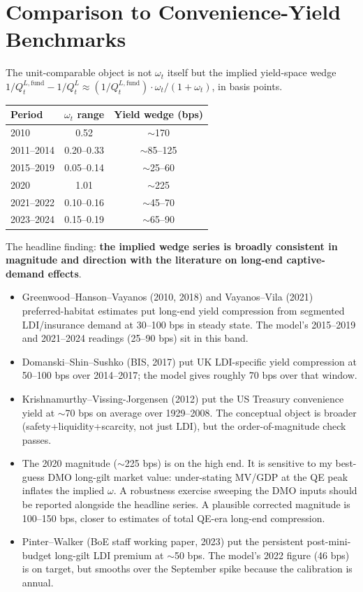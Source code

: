 \documentclass[11pt,a4paper]{article}
\begin{document}
\section{Comparison to Convenience-Yield Benchmarks}

The unit-comparable object is not $\omega_t$ itself but the implied yield-space wedge $1/Q^{L,\text{fund}}_t - 1/Q^L_t \approx (1/Q^{L,\text{fund}}_t) \cdot \omega_t/(1+\omega_t)$, in basis points.

\begin{center}
\begin{tabular}{l c c}
\toprule
Period & $\omega_t$ range & Yield wedge (bps) \\
\midrule
2010 & 0.52 & $\sim$170 \\
2011--2014 & 0.20--0.33 & $\sim$85--125 \\
2015--2019 & 0.05--0.14 & $\sim$25--60 \\
2020 & 1.01 & $\sim$225 \\
2021--2022 & 0.10--0.16 & $\sim$45--70 \\
2023--2024 & 0.15--0.19 & $\sim$65--90 \\
\bottomrule
\end{tabular}
\end{center}

The headline finding: \textbf{the implied wedge series is broadly consistent in magnitude and direction with the literature on long-end captive-demand effects}.

\begin{itemize}[leftmargin=*,nosep]
\item Greenwood--Hanson--Vayanos (2010, 2018) and Vayanos--Vila (2021) preferred-habitat estimates put long-end yield compression from segmented LDI/insurance demand at 30--100 bps in steady state. The model's 2015--2019 and 2021--2024 readings (25--90 bps) sit in this band.
\item Domanski--Shin--Sushko (BIS, 2017) put UK LDI-specific yield compression at 50--100 bps over 2014--2017; the model gives roughly 70 bps over that window.
\item Krishnamurthy--Vissing-Jorgensen (2012) put the US Treasury convenience yield at $\sim$70 bps on average over 1929--2008. The conceptual object is broader (safety+liquidity+scarcity, not just LDI), but the order-of-magnitude check passes.
\item The 2020 magnitude ($\sim$225 bps) is on the high end. It is sensitive to my best-guess DMO long-gilt market value: under-stating MV/GDP at the QE peak inflates the implied $\omega$. A robustness exercise sweeping the DMO inputs should be reported alongside the headline series. A plausible corrected magnitude is 100--150 bps, closer to estimates of total QE-era long-end compression.
\item Pinter--Walker (BoE staff working paper, 2023) put the persistent post-mini-budget long-gilt LDI premium at $\sim$50 bps. The model's 2022 figure (46 bps) is on target, but smooths over the September spike because the calibration is annual.
\end{itemize}
\end{document}
